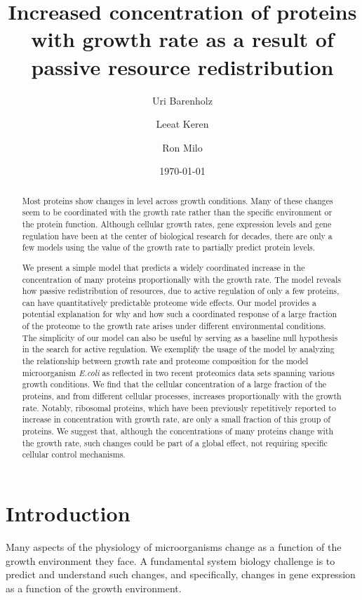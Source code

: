 \documentclass[a4paper]{article}
\title{Increased concentration of proteins with growth rate as a result of
passive resource redistribution}
\author{Uri Barenholz}
\author{Leeat Keren}
\author{Ron Milo}
\affil{Weizmann Institute of Science}
\date{\today}
\begin{document}
\maketitle 

\begin{abstract}
Most proteins show changes in level across growth conditions. Many of
these changes seem to be coordinated with the growth rate rather than
the specific environment or the protein function. Although cellular
growth rates, gene expression levels and gene regulation have been at
the center of biological research for decades, there are only a few
models using the value of the growth rate to partially predict protein
levels.

We present a simple model that predicts a widely coordinated increase in
the concentration of many proteins proportionally with the growth rate.
The model reveals how passive redistribution of resources, due to active
regulation of only a few proteins, can have quantitatively predictable
proteome wide effects. Our model provides a potential explanation for
why and how such a coordinated response of a large fraction of the
proteome to the growth rate arises under different environmental
conditions. The simplicity of our model can also be useful by serving as
a baseline null hypothesis in the search for active regulation. We
exemplify the usage of the model by analyzing the relationship between
growth rate and proteome composition for the model microorganism
\emph{E.coli} as reflected in two recent proteomics data sets spanning
various growth conditions. We find that the cellular concentration of a
large fraction of the proteins, and from different cellular processes,
increases proportionally with the growth rate. Notably, ribosomal
proteins, which have been previously repetitively reported to increase
in concentration with growth rate, are only a small fraction of this
group of proteins. We suggest that, although the concentrations of many
proteins change with the growth rate, such changes could be part of a
global effect, not requiring specific cellular control mechanisms.

\end{abstract}

\section{Introduction}
Many aspects of the physiology of microorganisms change as a function of the growth environment they face.
A fundamental system biology challenge is to predict and understand such changes, and specifically, changes in gene expression as a function of the growth environment.
\end{document}
